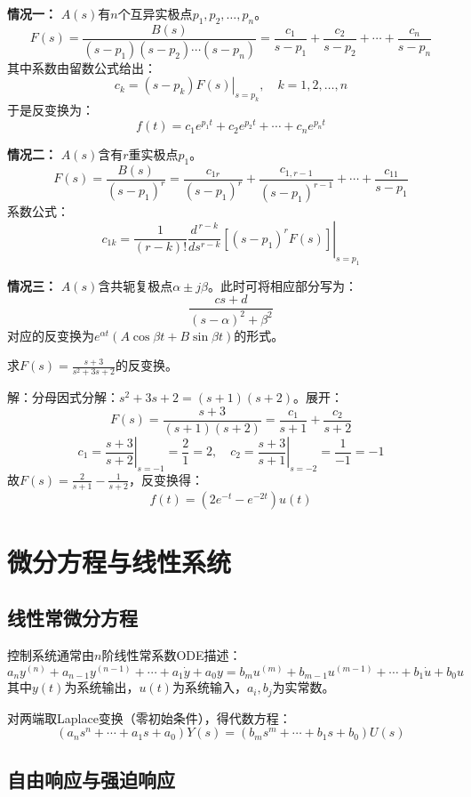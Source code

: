 \textbf{情况一：} $A(s)$有$n$个互异实极点$p_1,p_2,\dots,p_n$。
\[
F(s) = \frac{B(s)}{(s-p_1)(s-p_2)\cdots(s-p_n)} = \frac{c_1}{s-p_1} + \frac{c_2}{s-p_2} + \cdots + \frac{c_n}{s-p_n}
\]
其中系数由留数公式给出：
\[
c_k = \left. (s-p_k)F(s) \right|_{s=p_k}, \quad k=1,2,\dots,n
\]
于是反变换为：
\[
f(t) = c_1 e^{p_1 t} + c_2 e^{p_2 t} + \cdots + c_n e^{p_n t}
\]

\textbf{情况二：} $A(s)$含有$r$重实极点$p_1$。
\[
F(s) = \frac{B(s)}{(s-p_1)^r} = \frac{c_{1r}}{(s-p_1)^r} + \frac{c_{1,r-1}}{(s-p_1)^{r-1}} + \cdots + \frac{c_{11}}{s-p_1}
\]
系数公式：
\[
c_{1k} = \frac{1}{(r-k)!}\left. \frac{d^{\,r-k}}{ds^{r-k}}\left[(s-p_1)^r F(s)\right] \right|_{s=p_1}
\]

\textbf{情况三：} $A(s)$含共轭复极点$\alpha \pm j\beta$。此时可将相应部分写为：
\[
\frac{cs+d}{(s-\alpha)^2 + \beta^2}
\]
对应的反变换为$e^{\alpha t}(A\cos\beta t + B\sin\beta t)$的形式。

\begin{example}
求$F(s) = \frac{s+3}{s^2 + 3s + 2}$的反变换。

{\heiti 解}：分母因式分解：$s^2 + 3s + 2 = (s+1)(s+2)$。展开：
\[
F(s) = \frac{s+3}{(s+1)(s+2)} = \frac{c_1}{s+1} + \frac{c_2}{s+2}
\]
\[
c_1 = \left.\frac{s+3}{s+2}\right|_{s=-1} = \frac{2}{1} = 2,\quad
c_2 = \left.\frac{s+3}{s+1}\right|_{s=-2} = \frac{1}{-1} = -1
\]
故$F(s) = \frac{2}{s+1} - \frac{1}{s+2}$，反变换得：
\[
f(t) = (2e^{-t} - e^{-2t})u(t)
\]
\end{example}

\section{微分方程与线性系统}

\subsection{线性常微分方程}

控制系统通常由$n$阶线性常系数ODE描述：
\[
a_n y^{(n)} + a_{n-1}y^{(n-1)} + \cdots + a_1 \dot{y} + a_0 y
= b_m u^{(m)} + b_{m-1}u^{(m-1)} + \cdots + b_1 \dot{u} + b_0 u
\]
其中$y(t)$为系统输出，$u(t)$为系统输入，$a_i, b_j$为实常数。

对两端取Laplace变换（零初始条件），得代数方程：
\[
(a_n s^n + \cdots + a_1 s + a_0)Y(s) = (b_m s^m + \cdots + b_1 s + b_0)U(s)
\]

\subsection{自由响应与强迫响应}

